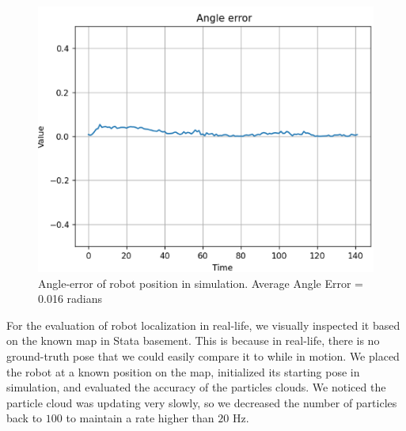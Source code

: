 \documentclass[11pt,twocolumn]{article}
\begin{document}
\begin{figure}[H]
    \centering
\includegraphics[scale=0.6]{figures/angle_error.png}
    \caption{Angle-error of robot position in simulation. Average Angle Error = 0.016 radians}
    \label{fig:4}
\end{figure}


For the evaluation of robot localization in real-life, we visually inspected it based on the known map in Stata basement. This is because in real-life, there is no ground-truth pose that we could easily compare it to while in motion. We placed the robot at a known position on the map, initialized its starting pose in simulation, and evaluated the accuracy of the particles clouds. We noticed the particle cloud was updating very slowly, so we decreased the number of particles back to $100$ to maintain a rate higher than $20$ Hz.


\end{document}
